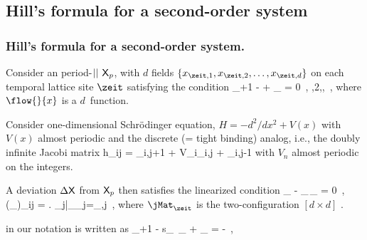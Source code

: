 
    \ifblog
\subsection{Hill's formula for a second-order system}
    \else %
\subsubsection{Hill's formula for a second-order system.}
    \fi
\label{exam:Hill2ndOrd}


Consider an period-${||}$ {\lattstate} $\mathsf{X}_p$, with $d$ fields
$\{\ssp_{\zeit,1},\ssp_{\zeit,2},\dots,\ssp_{\zeit,d}\}$ on each temporal
lattice site $\zeit$ satisfying the condition
\beq
\ssp_{\zeit+1} -  + \ssp_{} = 0
    \,,\quad
{},2,\cdots,\cl{}
\,,
where $\flow{}{\ssp}$ is a $d$\dmn\ function.

Consider one-dimensional Schrödinger
equation,
$H = -d^2/dx^2 + V(x)$ with $V(x)$
almost periodic and the discrete (= tight binding) analog, i.e., the
doubly infinite Jacobi matrix
\beq
h_{ij} = \delta_{i,j+1}  + V_i\delta_{i,j} + \delta_{i,j-1}
with $V_n$ almost periodic on the integers.

A deviation $\Delta\mathsf{X}$ from $\mathsf{X}_p$ then satisfies the linearized condition
\beq
\Delta\ssp_{\zeit} - \jMat_{}\,\Delta\ssp_{} = 0
\,,\qquad
(\jMat_{\zeit})_{ij}
=
\left.
           {\partial \ssp_{j}}\right|_{\ssp_{j}=\ssp_{\zeit,j}}
\,,
where $\jMat_{\zeit}$ is the two-configuration $[d\!\times\!{d}]$
\jacobianM.

in our notation
 is written as
\beq
\ssp_{\ell+1}  -  {s}_\ell\, \ssp_{\ell} + \ssp_{}
    =
-\Ssym{\ell}
\,,

